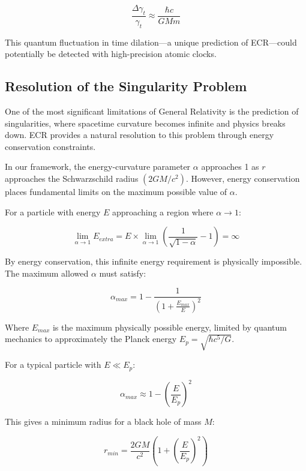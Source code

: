 \documentclass[11pt,a4paper]{article}
\newcommand{\keyequation}[2]{
    \begin{equation}
        \boxed{#1} \tag{#2}
    \end{equation}
}
\begin{document}
\begin{equation}
    \frac{\Delta\gamma_t}{\gamma_t} \approx \frac{\hbar c}{GMm}
\end{equation}

This quantum fluctuation in time dilation—a unique prediction of ECR—could potentially be detected with high-precision atomic clocks.

\subsection{Resolution of the Singularity Problem}

One of the most significant limitations of General Relativity is the prediction of singularities, where spacetime curvature becomes infinite and physics breaks down. ECR provides a natural resolution to this problem through energy conservation constraints.

In our framework, the energy-curvature parameter $\alpha$ approaches 1 as $r$ approaches the Schwarzschild radius $(2GM/c^2)$. However, energy conservation places fundamental limits on the maximum possible value of $\alpha$.

For a particle with energy $E$ approaching a region where $\alpha \to 1$:

\begin{equation}
    \lim_{\alpha \to 1} E_{extra} = E \times \lim_{\alpha \to 1} \left(\frac{1}{\sqrt{1-\alpha}} - 1\right) = \infty
\end{equation}

By energy conservation, this infinite energy requirement is physically impossible. The maximum allowed $\alpha$ must satisfy:

\begin{equation}
    \alpha_{max} = 1 - \frac{1}{\left(1 + \frac{E_{max}}{E}\right)^2}
\end{equation}

Where $E_{max}$ is the maximum physically possible energy, limited by quantum mechanics to approximately the Planck energy $E_p = \sqrt{\hbar c^5/G}$.

For a typical particle with $E \ll E_p$:

\begin{equation}
    \alpha_{max} \approx 1 - \left(\frac{E}{E_p}\right)^2
\end{equation}

This gives a minimum radius for a black hole of mass $M$:

\keyequation{r_{min} = \frac{2GM}{c^2}\left(1 + \left(\frac{E}{E_p}\right)^2\right)}{6}
\end{document}
